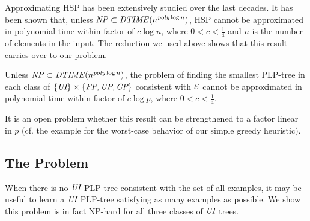 Approximating HSP has been extensively studied over the last decades.
It has been shown \cite{lund1994hardness} that, unless $\mathit{NP} \subset \mathit{DTIME}(n^{\mathit{poly} \log n})$,
HSP cannot be approximated 
in polynomial time within factor of $c \log n$, where $0<c<\frac{1}{4}$ and
$n$ is the number of elements in the input. The reduction we used above
shows that this result
carries over to our problem.
\begin{thm}
\label{thm:UI_smallest_approx}
	Unless $\mathit{NP} \subset \mathit{DTIME}(n^{\mathit{poly} \log n})$,
	the problem of finding the smallest PLP-tree in each class of $\{\textit{UI}\} \times \{\textit{FP},\textit{UP},\textit{CP}\}$ 
	consistent with $\mathcal{E}$ cannot be approximated 
	in polynomial time within factor of $c \log p$, where $0<c<\frac{1}{4}$.
\end{thm}
It is an open problem whether this result can be strengthened to a factor 
linear in $p$ (cf. the example for the worst-case behavior of our simple 
greedy heuristic).


\vspace{-0.1cm}
\subsection{The  Problem}

\vspace{-0.1cm}
When there is no $\textit{UI}$ PLP-tree consistent with the set of all examples,
it may be useful to learn a $\textit{UI}$ PLP-tree satisfying as many examples 
as possible. We show this problem is in fact NP-hard for all three 
classes of $\textit{UI}$ trees.

